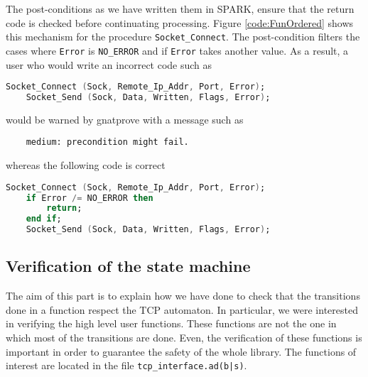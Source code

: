 \documentclass[a4paper, 10pt]{article}
\begin{document}
    The post-conditions as we have written them in SPARK, ensure that the return code is checked
    before continuating processing. Figure \ref{code:FunOrdered} shows this mechanism for the
    procedure \lstinline[language=Ada]{Socket_Connect}. The post-condition filters the cases
    where \lstinline{Error} is \lstinline{NO_ERROR} and if \lstinline{Error} takes another value.
    As a result, a user who would write an incorrect code such as
    \begin{lstlisting}[language=Ada]
    Socket_Connect (Sock, Remote_Ip_Addr, Port, Error);
    Socket_Send (Sock, Data, Written, Flags, Error);
    \end{lstlisting}
    would be warned by gnatprove with a message such as
    \begin{verbatim}
    medium: precondition might fail.
    \end{verbatim}
    whereas the following code is correct
    \begin{lstlisting}[language=Ada]
    Socket_Connect (Sock, Remote_Ip_Addr, Port, Error);
    if Error /= NO_ERROR then
        return;
    end if;
    Socket_Send (Sock, Data, Written, Flags, Error);
    \end{lstlisting}





    \subsection{Verification of the state machine}

    The aim of this part is to explain how we have done to check that the transitions done
    in a function respect the TCP automaton. In particular, we were interested in verifying
    the high level user functions. These functions are not the one in which most of the
    transitions are done. Even, the verification of these functions is important in order
    to guarantee the safety of the whole library. The functions of interest are located in
    the file \texttt{tcp\_interface.ad(b|s)}.
\end{document}
